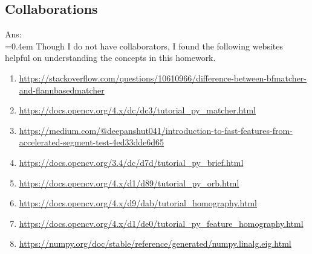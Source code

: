 \documentclass{article}
\begin{document}
	\subsection*{Collaborations}
	Ans:\\
	\hangindent=0.4em \hspace{0.3em} Though I do not have collaborators, I found the following websites helpful on understanding the concepts in this homework.
	\begin{enumerate}
		\item \url{https://stackoverflow.com/questions/10610966/difference-between-bfmatcher-and-flannbasedmatcher}
		\item \url{https://docs.opencv.org/4.x/dc/dc3/tutorial_py_matcher.html}
		\item \url{https://medium.com/@deepanshut041/introduction-to-fast-features-from-accelerated-segment-test-4ed33dde6d65}
		\item \url{https://docs.opencv.org/3.4/dc/d7d/tutorial_py_brief.html}
		\item \url{https://docs.opencv.org/4.x/d1/d89/tutorial_py_orb.html}
		\item \url{https://docs.opencv.org/4.x/d9/dab/tutorial_homography.html}
		\item \url{https://docs.opencv.org/4.x/d1/de0/tutorial_py_feature_homography.html}
		\item \url{https://numpy.org/doc/stable/reference/generated/numpy.linalg.eig.html}
	\end{enumerate}
	

	
\end{document}
